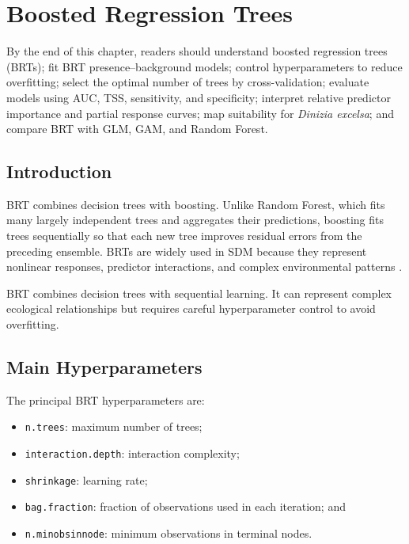 \chapter[BRT]{Boosted Regression Trees}

\begin{objetivos}
By the end of this chapter, readers should understand boosted regression trees
(BRTs); fit BRT presence--background models; control hyperparameters to reduce
overfitting; select the optimal number of trees by cross-validation; evaluate
models using AUC, TSS, sensitivity, and specificity; interpret relative
predictor importance and partial response curves; map suitability for
\textit{Dinizia excelsa}; and compare BRT with GLM, GAM, and Random Forest.
\end{objetivos}

\section{Introduction}

BRT combines decision trees with boosting. Unlike Random Forest, which fits
many largely independent trees and aggregates their predictions, boosting fits
trees sequentially so that each new tree improves residual errors from the
preceding ensemble. BRTs are widely used in SDM because they represent
nonlinear responses, predictor interactions, and complex environmental patterns
\parencite{elith2008working,elith2009,guisan2017habitat}.

\begin{conceito}[title={\faBook\quad BRT in SDM}]
BRT combines decision trees with sequential learning. It can represent complex
ecological relationships but requires careful hyperparameter control to avoid
overfitting.
\end{conceito}

\section{Main Hyperparameters}

The principal BRT hyperparameters are:
\begin{itemize}
  \item \texttt{n.trees}: maximum number of trees;
  \item \texttt{interaction.depth}: interaction complexity;
  \item \texttt{shrinkage}: learning rate;
  \item \texttt{bag.fraction}: fraction of observations used in each iteration; and
  \item \texttt{n.minobsinnode}: minimum observations in terminal nodes.
\end{itemize}

